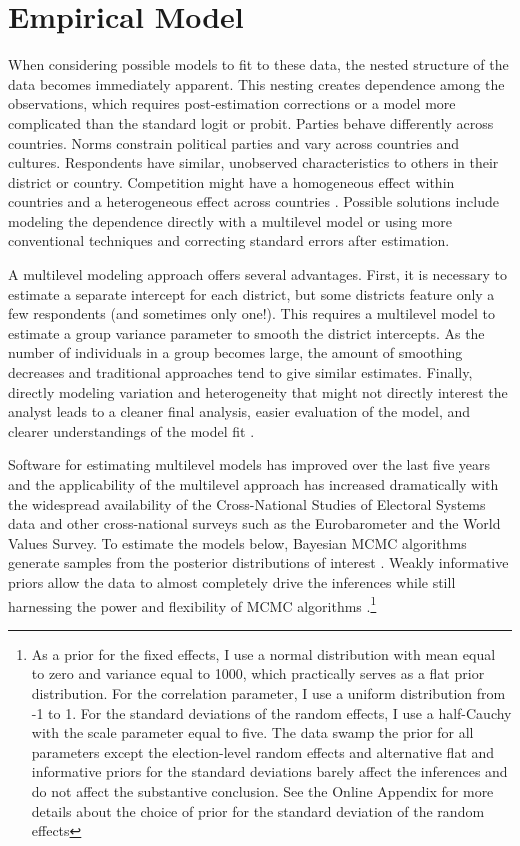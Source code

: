\documentclass[12pt]{article}
\begin{document}
\section*{Empirical Model}

When considering possible models to fit to these data, the nested structure of the data becomes immediately apparent. This nesting creates dependence among the observations, which requires post-estimation corrections or a model more complicated than the standard logit or probit. Parties behave differently across countries. Norms constrain political parties and vary across countries and cultures. Respondents have similar, unobserved characteristics to others in their district or country. Competition might have a homogeneous effect within countries and a heterogeneous effect across countries \citep{Western1998}. Possible solutions include modeling the dependence directly with a multilevel model or using more conventional techniques and correcting standard errors after estimation.

A multilevel modeling approach offers several advantages. First, it is necessary to estimate a separate intercept for each district, but some districts feature only a few respondents (and sometimes only one!). This requires a multilevel model to estimate a group variance parameter to smooth the district intercepts. As the number of individuals in a group becomes large, the amount of smoothing decreases and traditional approaches tend to give similar estimates. Finally, directly modeling variation and heterogeneity that might not directly interest the analyst leads to a cleaner final analysis, easier evaluation of the model, and clearer understandings of the model fit \citep{Gelman2005, Gelman2006}.

Software for estimating multilevel models has improved over the last five years and the applicability of the multilevel approach has increased dramatically with the widespread availability of the Cross-National Studies of Electoral Systems data and other cross-national surveys such as the Eurobarometer and the World Values Survey. To estimate the models below, Bayesian MCMC algorithms generate samples from the posterior distributions of interest \citep{Gill2008, Gelmanetal2004, GelmanHill2007}. Weakly informative priors \cite{Gelman2006a} allow the data to almost completely drive the inferences while still harnessing the power and flexibility of MCMC algorithms \citep{Jackman2000, Jackman2004}.\footnote{As a prior for the fixed effects, I use a normal distribution with mean equal to zero and variance equal to 1000, which practically serves as  a flat prior distribution. For the correlation parameter, I use a uniform distribution from -1 to 1. For the standard deviations of the random effects, I use a half-Cauchy with the scale parameter equal to five. The data swamp the prior for all parameters except the election-level random effects and alternative flat and informative  priors for the standard deviations barely affect the inferences and do not affect the substantive conclusion. See the Online Appendix for more details about the choice of prior for the standard deviation of the random effects}
\end{document}
